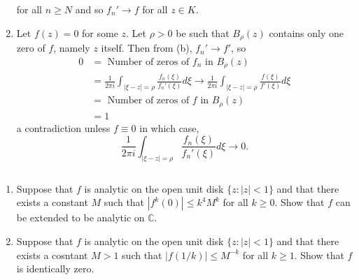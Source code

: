 \documentclass[12pt]{Homework}
\begin{document}
\begin{solution}
\begin{enumerate}[label=(\alph*)]
    for all $n\ge N$ and so $f_n'\to f$ for all $z\in K$.

    \item Let $f(z)=0$ for some $z$. Let $\rho>0$ be such that $B_\rho(z)$ contains only one zero of $f$, namely $z$ itself. Then from (b), $f_n'\to f'$, so \begin{align*}
        0&=\text{ Number of zeros of }f_n\text{ in }B_\rho(z)\\
        &=\frac{1}{2\pi i}\int_{|\xi-z|=\rho}\frac{f_n(\xi)}{f_n'(\xi)}d\xi\to\frac{1}{2\pi i}\int_{|\xi-z|=\rho}\frac{f(\xi)}{f'(\xi)}d\xi\\
        &=\text{ Number of zeros of }f\text{ in }B_\rho(z)\\
        &=1
    \end{align*} a contradiction unless $f\equiv 0$ in which case, $$\frac{1}{2\pi i}\int_{|\xi-z|=\rho}\frac{f_n(\xi)}{f_n'(\xi)}d\xi\to0.$$
\end{enumerate}
\end{solution}
\newpage





\begin{problem} $\,$
\begin{enumerate}[label=(\alph*)]
    \item Suppose that $f$ is analytic on the open unit disk $\{z:|z|<1\}$ and that there exists a constant $M$ such that $|f^k(0)|\le k^4M^k$ for all $k\ge 0.$ Show that $f$ can be extended to be analytic on $\mathbb{C}.$
    \item Suppose that $f$ is analytic on the open unit disk $\{z:|z|<1\}$ and that there exists a cosntant $M>1$ such that $|f(1/k)|\le M^{-k}$ for all $k\ge1$. Show that $f$ is identically zero.
\end{enumerate}
\end{problem}
\end{document}
